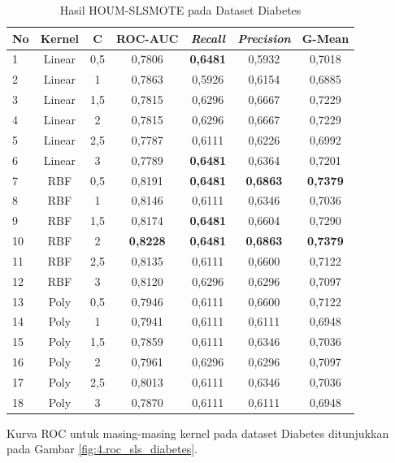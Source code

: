 \begin{table}[H]
\centering
\caption{Hasil HOUM-SLSMOTE pada Dataset Diabetes}
\label{table:4.sls_diabetes}
\footnotesize
\begin{tabular}{|l|c|c|c|c|c|c|}
\hline
\textbf{No} & \textbf{Kernel} & \textbf{C} & \textbf{ROC-AUC} & \textbf{\textit{Recall}} & \textbf{\textit{Precision}} & \textbf{G-Mean} \\
\hline
1 & Linear & 0,5 & 0,7806 & \textbf{0,6481} & 0,5932 & 0,7018 \\
\hline
2 & Linear & 1 & 0,7863 & 0,5926 & 0,6154 & 0,6885 \\
\hline
3 & Linear & 1,5 & 0,7815 & 0,6296 & 0,6667 & 0,7229 \\
\hline
4 & Linear & 2 & 0,7815 & 0,6296 & 0,6667 & 0,7229 \\
\hline
5 & Linear & 2,5 & 0,7787 & 0,6111 & 0,6226 & 0,6992 \\
\hline
6 & Linear & 3 & 0,7789 & \textbf{0,6481} & 0,6364 & 0,7201 \\
\hline
7 & RBF & 0,5 & 0,8191 & \textbf{0,6481} & \textbf{0,6863} & \textbf{0,7379} \\
\hline
8 & RBF & 1 & 0,8146 & 0,6111 & 0,6346 & 0,7036 \\
\hline
9 & RBF & 1,5 & 0,8174 & \textbf{0,6481} & 0,6604 & 0,7290 \\
\hline
10 & RBF & 2 & \textbf{0,8228} & \textbf{0,6481} & \textbf{0,6863} & \textbf{0,7379} \\
\hline
11 & RBF & 2,5 & 0,8135 & 0,6111 & 0,6600 & 0,7122 \\
\hline
12 & RBF & 3 & 0,8120 & 0,6296 & 0,6296 & 0,7097 \\
\hline
13 & Poly & 0,5 & 0,7946 & 0,6111 & 0,6600 & 0,7122 \\
\hline
14 & Poly & 1 & 0,7941 & 0,6111 & 0,6111 & 0,6948 \\
\hline
15 & Poly & 1,5 & 0,7859 & 0,6111 & 0,6346 & 0,7036 \\
\hline
16 & Poly & 2 & 0,7961 & 0,6296 & 0,6296 & 0,7097 \\
\hline
17 & Poly & 2,5 & 0,8013 & 0,6111 & 0,6346 & 0,7036 \\
\hline
18 & Poly & 3 & 0,7870 & 0,6111 & 0,6111 & 0,6948 \\
\hline
\end{tabular}
\end{table}

Kurva ROC untuk masing-masing kernel pada dataset Diabetes ditunjukkan pada Gambar \ref{fig:4.roc_sls_diabetes}.

